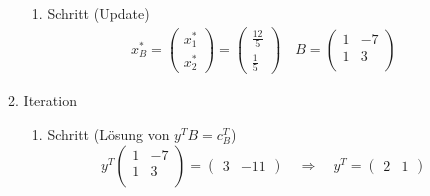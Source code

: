 \documentclass[a4paper]{scrartcl}
\begin{document}
\begin{enumerate}[label=\bfseries\arabic*.]
\begin{enumerate}[1.]
\begin{enumerate}[1.]
                    \item Schritt (Update)
                        \begin{gather}
                            x_B^* =
                            \begin{pmatrix}
                                x_1^* \\ x_2^*
                            \end{pmatrix}
                            =
                            \begin{pmatrix}
                                \frac{12}{5} \\ \frac{1}{5}
                            \end{pmatrix}
                            \quad
                            B =
                            \begin{pmatrix}
                                1 & -7 \\
                                1 &  3 \\
                            \end{pmatrix}
                        \end{gather}

                \end{enumerate}

            \item Iteration
                \begin{enumerate}[1.]
                    \item Schritt (Lösung von $y^TB = c_B^T$)
                        \begin{equation}
                            y^T
                            \begin{pmatrix}
                                1 & -7 \\
                                1 &  3 \\
                            \end{pmatrix}
                            =
                            \begin{pmatrix}
                                3 & -11
                            \end{pmatrix}
                            \quad\Rightarrow\quad
                            y^T =
                            \begin{pmatrix}
                                2 & 1
                            \end{pmatrix}
                        \end{equation}
                        

\end{enumerate}
\end{enumerate}
\end{enumerate}
\end{document}
